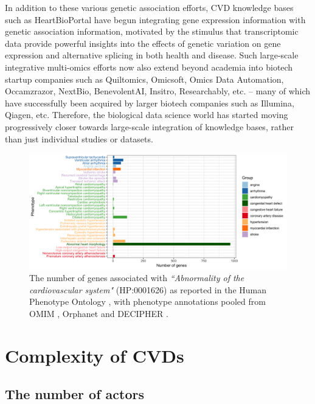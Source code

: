 \documentclass[letter]{bioinfo}
\begin{document}
	In addition to these various genetic association efforts, CVD knowledge bases such as HeartBioPortal \citep{Khomtchouk:2018:HeartBioPortal} have begun integrating gene expression information with genetic association information, motivated by the stimulus that transcriptomic data provide powerful insights into the effects of genetic variation on gene expression and alternative splicing in both health and disease.  Such large-scale integrative multi-omics efforts now also extend beyond academia into biotech startup companies such as Quiltomics, Omicsoft, Omics Data Automation, Occamzrazor, NextBio, BenevolentAI, Insitro, Researchably, etc. -- many of which have successfully been acquired by larger biotech companies such as Illumina, Qiagen, etc.  Therefore, the biological data science world has started moving progressively closer towards large-scale integration of knowledge bases, rather than just individual studies or datasets.    


		\begin{figure}[!tpb]
		\includegraphics[width=1.\linewidth]{hpo-gene-count}
		\caption{The number of genes associated with \emph{``Abnormality of the cardiovascular system"} (HP:0001626) as reported in the Human Phenotype Ontology \citep{Kohler:2014:Human},
			 with phenotype annotations pooled from OMIM \citep{McKusick:2018:OMIM} , Orphanet \citep{INSERM:1997:Orphanet}  and DECIPHER \citep{Firth:2009:DECIPHER}.}
		\label{fig:hpo_gene_count}	
	\end{figure}
	
	
	
	
	\section*{Complexity of CVDs}  %
	\subsection*{The number of actors}
	
\end{document}
